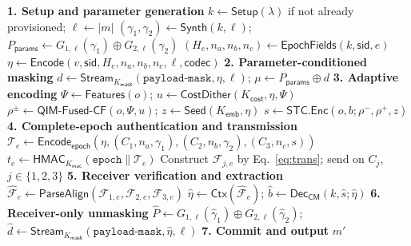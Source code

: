 \documentclass[pdflatex,sn-mathphys-num]{sn-jnl}%
\theoremstyle{definition}
\theoremstyle{game}
\theoremstyle{thmstyleone}%
\theoremstyle{thmstyletwo}%
\theoremstyle{thmstylethree}%
\begin{document}
\begin{algorithm}[H]
\footnotesize
\caption{$\mathcal S_{\mathsf{CPM}}$ with Parameter-Conditioned Masking}
\label{alg:HybridStegoModel}
\textbf{1. Setup and parameter generation}\;
$k\leftarrow\mathsf{Setup}(\lambda)$ if not already provisioned; $\ell\leftarrow|m|$\;
$(\gamma_1,\gamma_2)\leftarrow\mathsf{Synth}(k,\ell)$;
$P_{\mathsf{params}}\leftarrow G_{1,\ell}(\gamma_1)\oplus G_{2,\ell}(\gamma_2)$\;
$(H_e,n_a,n_b,n_c)\leftarrow\mathsf{EpochFields}(k,\mathsf{sid},e)$\;
$\eta\leftarrow\mathsf{Encode}(v,\mathsf{sid},H_e,n_a,n_b,n_c,\ell,\mathsf{codec})$\;
\BlankLine
\textbf{2. Parameter-conditioned masking}\;
$d\leftarrow\mathsf{Stream}_{K_{\mathsf{mask}}}(\texttt{payload-mask},\eta,\ell)$;
$\mu\leftarrow P_{\mathsf{params}}\oplus d$\;
\BlankLine
\textbf{3. Adaptive encoding}\;
$\Psi\leftarrow\mathsf{Features}(o)$; $u\leftarrow\mathsf{CostDither}(K_{\mathsf{cost}},\eta,\Psi)$\;
$\rho^\pm\leftarrow\mathsf{QIM\text{-}Fused\text{-}CF}(o,\Psi,u)$;
$z\leftarrow\mathsf{Seed}(K_{\mathsf{emb}},\eta)$\;
$s\leftarrow\mathsf{STC.Enc}(o,b;\rho^-,\rho^+,z)$\;
\BlankLine
\textbf{4. Complete-epoch authentication and transmission}\;
$\mathcal T_e\leftarrow\mathsf{Encode}_{\mathsf{epoch}}(\eta,(C_1,n_a,\gamma_1),(C_2,n_b,\gamma_2),(C_3,n_c,s))$\;
$t_e\leftarrow\mathsf{HMAC}_{K_{\mathsf{mac}}}(\texttt{epoch}\parallel\mathcal T_e)$\;
Construct $\mathcal F_{j,e}$ by Eq.~\eqref{eq:trans}; send on $C_j$, $j\in\{1,2,3\}$\;
\BlankLine
\textbf{5. Receiver verification and extraction}\;
$\widehat{\mathcal F}_e\leftarrow\mathsf{ParseAlign}(\mathcal F_{1,e},\mathcal F_{2,e},\mathcal F_{3,e})$\;
$\widehat\eta\leftarrow\mathsf{Ctx}(\widehat{\mathcal F}_e)$;
$\widehat b\leftarrow\mathsf{Dec}_{\mathsf{CM}}(k,\widehat s;\widehat\eta)$\;
\BlankLine
\textbf{6. Receiver-only unmasking}\;
$\widehat P\leftarrow G_{1,\ell}(\widehat\gamma_1)\oplus G_{2,\ell}(\widehat\gamma_2)$;
$\widehat d\leftarrow\mathsf{Stream}_{K_{\mathsf{mask}}}(\texttt{payload-mask},\widehat\eta,\ell)$\;
\BlankLine
\textbf{7. Commit and output}\;
\Return $m'$ 
\end{algorithm}
\end{document}
